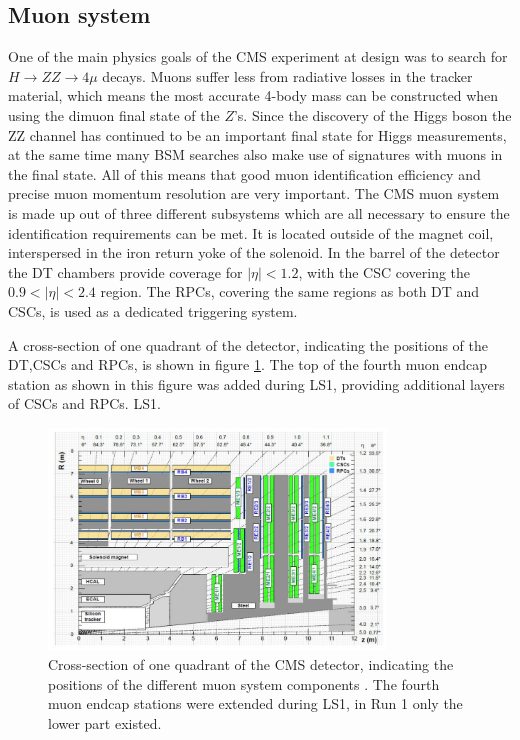 \subsection{Muon system}
\label{sec:CMSLHC_CMS_muons}
One of the main physics goals of the \ac{CMS} experiment
at design was to search for $H\rightarrow ZZ\rightarrow 4\mu$ decays. Muons
suffer less from radiative losses in the tracker material, which means the most accurate
4-body mass can be constructed when using the dimuon final state of the $Z$'s.
Since the discovery of the Higgs boson the ZZ channel has continued to be an important
final state for Higgs measurements, at the same time many \ac{BSM} searches also make use of 
signatures with muons in the final state.
All of this means that good muon identification efficiency and precise muon momentum resolution
are very important. The \ac{CMS} muon system is made up out of three different subsystems which
are all necessary to ensure the identification requirements can be met. It is located
outside of the magnet coil, interspersed in the iron return yoke of the solenoid.
In the barrel of the detector the \ac{DT} chambers provide coverage for $|\eta|<1.2$, with
the \ac{CSC} covering the $0.9<|\eta|<2.4$ region. The \ac{RPCs}, covering the same
regions as both \ac{DT} and \ac{CSCs}, is used as a dedicated triggering system.

A cross-section of one quadrant of the detector, indicating
the positions of the \ac{DT},\ac{CSCs} and \ac{RPCs}, is shown in figure \ref{fig:CMS_MuonSystem}.
The top of the fourth muon endcap station as shown in this figure was added during \ac{LS1}, providing
additional layers of \ac{CSCs} and \ac{RPCs}.
\ac{LS1}.
\begin{figure}[h!]
\begin{center}
\includegraphics[width=0.8\textwidth]{./Detector/Plots/MuonSystemUpgrade.png}
\caption{Cross-section of one quadrant of the CMS detector, indicating
the positions of the different muon system components \cite{cms-muon-upgrade}. The 
fourth muon endcap stations were extended during \ac{LS1}, in Run 1 only the lower
part existed.}
\label{fig:CMS_MuonSystem}
\end{center}
\end{figure}

